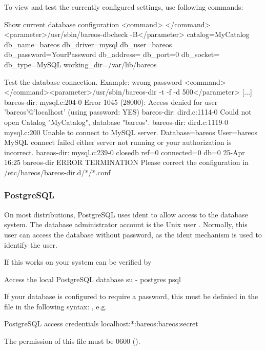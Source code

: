 To view and test the currently configured settings, use following commands:
\begin{commands}{Show current database configuration}
<command> </command><parameter>/usr/sbin/bareos-dbcheck -B</parameter>
catalog=MyCatalog
db_name=bareos
db_driver=mysql
db_user=bareos
db_password=YourPassword
db_address=
db_port=0
db_socket=
db_type=MySQL
working_dir=/var/lib/bareos
\end{commands}

\begin{commands}{Test the database connection. Example: wrong password}
<command> </command><parameter>/usr/sbin/bareos-dir -t -f -d 500</parameter>
[...]
bareos-dir: mysql.c:204-0 Error 1045 (28000): Access denied for user 'bareos'@'localhost' (using password: YES)
bareos-dir: dird.c:1114-0 Could not open Catalog "MyCatalog", database "bareos".
bareos-dir: dird.c:1119-0 mysql.c:200 Unable to connect to MySQL server.
Database=bareos User=bareos
MySQL connect failed either server not running or your authorization is incorrect.
bareos-dir: mysql.c:239-0 closedb ref=0 connected=0 db=0
25-Apr 16:25 bareos-dir ERROR TERMINATION
Please correct the configuration in /etc/bareos/bareos-dir.d/*/*.conf
\end{commands}




\subsubsection{PostgreSQL}

On most distributions, PostgreSQL uses ident to allow access to the database system.
The database administrator account is the Unix user .
Normally, this user can access the database without password, as the ident mechanism is used to identify the user.

If this works on your system can be verified by
\begin{commands}{Access the local PostgreSQL database}
su - postgres
psql
\end{commands}

If your database is configured to require a password, this must be definied in the file
in the following syntax: , e.g.
\begin{config}{PostgreSQL access credentials}
localhost:*:bareos:bareos:secret
\end{config}
The permission of this file must be 0600 ().


